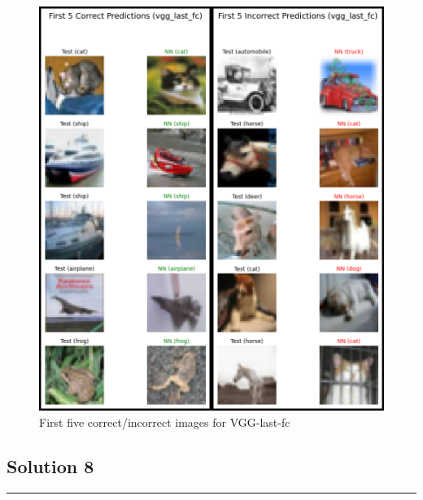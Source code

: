 \documentclass{article}
\begin{document}
\begin{figure}[h]
  \includegraphics[height=0.75\textheight,width=\textwidth]{vgg_last_fc.png}
  \caption{First five correct/incorrect images for VGG-last-fc}
\end{figure}

\newpage

\subsection*{Solution 8}
\noindent\rule{\textwidth}{0.4pt}\\
\end{document}
